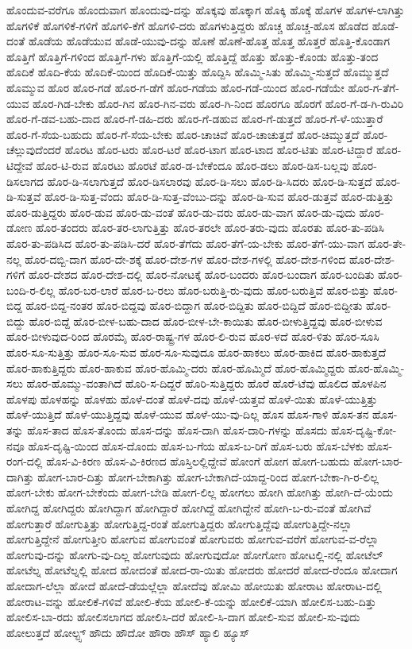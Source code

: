 {ಹೊಂದುವ-ವರೆಗೂ
ಹೊಂದುವಾಗ
ಹೊಂದುವು-ದನ್ನು
ಹೊಕ್ಕವು
ಹೊಕ್ಕಾಗ
ಹೊಕ್ಕಿ
ಹೊಕ್ಕೆ
ಹೊಗಳ
ಹೊಗಳ-ಲಾಗಿತ್ತು
ಹೊಗಳಿಕೆ
ಹೊಗಳಿಕೆ-ಗಳಿಗೆ
ಹೊಗಳಿ-ಕೆಗೆ
ಹೊಗಳಿ-ದರು
ಹೊಗಳುತ್ತಿದ್ದರು
ಹೊಚ್ಚ
ಹೊಚ್ಚ-ಹೊಸ
ಹೊಡೆದ
ಹೊಡೆ-ದಂತೆ
ಹೊಡೆಯ
ಹೊಡೆಯುವ
ಹೊಡೆ-ಯುವು-ದನ್ನು
ಹೊಣೆ
ಹೊಣೆ-ಹೊತ್ತ
ಹೊತ್ತ
ಹೊತ್ತರೆ
ಹೊತ್ತಿ-ಕೊಂಡಾಗ
ಹೊತ್ತಿಗೆ
ಹೊತ್ತಿಗೆ-ಗಳಿಂದ
ಹೊತ್ತಿಗೆ-ಗಳು
ಹೊತ್ತಿಗೆ-ಯಲ್ಲಿ
ಹೊತ್ತಿದ್ದೆ
ಹೊತ್ತು
ಹೊತ್ತು-ಕೊಂಡು
ಹೊತ್ತು-ತಂದ
ಹೊದಿಕೆ
ಹೊದಿ-ಕೆಯ
ಹೊದಿಕೆ-ಯಿಂದ
ಹೊದಿಕೆ-ಯಿತ್ತು
ಹೊದ್ದಿಸಿ
ಹೊಮ್ಮಿ-ಸಿತು
ಹೊಮ್ಮಿ-ಸುತ್ತದೆ
ಹೊಮ್ಮುತ್ತದೆ
ಹೊಮ್ಮುವ
ಹೊರ
ಹೊರ-ಗಡೆ
ಹೊರ-ಗ-ಡೆಗೆ
ಹೊರ-ಗಡೆಯ
ಹೊರ-ಗಡೆ-ಯಿಂದ
ಹೊರ-ಗಡೆಯೇ
ಹೊರ-ಗ-ತೆಗೆ-ಯುವ
ಹೊರ-ಗಿಡ-ಬೇಕು
ಹೊರ-ಗಿನ
ಹೊರ-ಗಿನ-ವರು
ಹೊರ-ಗಿ-ನಿಂದ
ಹೊರಗೂ
ಹೊರಗೆ
ಹೊರ-ಗೆ-ಡ-ಗಿ-ರುವಿರಿ
ಹೊರ-ಗೆ-ಡವ-ಬಹು-ದಾದ
ಹೊರ-ಗೆ-ಡಹಿ-ದರು
ಹೊರ-ಗೆ-ಡಹುವ
ಹೊರ-ಗೆ-ಡುತ್ತದೆ
ಹೊರ-ಗೆ-ಳೆ-ಯುತ್ತಾರೆ
ಹೊರ-ಗೆ-ಸೆಯ-ಬಹುದು
ಹೊರ-ಗೆ-ಸೆಯ-ಬೇಕು
ಹೊರ-ಚಾಚಿವೆ
ಹೊರ-ಚಾಚುತ್ತದೆ
ಹೊರ-ಚಿಮ್ಮುತ್ತದೆ
ಹೊರ-ಚೆಲ್ಲುವುದೆಂದರೆ
ಹೊರಟ
ಹೊರ-ಟರು
ಹೊರ-ಟರೆ
ಹೊರ-ಟಾಗ
ಹೊರ-ಟಾದ
ಹೊರ-ಟಿತು
ಹೊರ-ಟಿದ್ದಾರೆ
ಹೊರ-ಟಿದ್ದೇವೆ
ಹೊರ-ಟಿ-ರುವ
ಹೊರಟು
ಹೊರಟೆ
ಹೊರ-ಡ-ಬೇಕೆಂದೂ
ಹೊರ-ಡಲು
ಹೊರ-ಡಿಸ-ಬಲ್ಲವು
ಹೊರ-ಡಿಸಲಾಗದ
ಹೊರ-ಡಿ-ಸಲಾಗುತ್ತದೆ
ಹೊರ-ಡಿಸಲಾರವು
ಹೊರ-ಡಿ-ಸಲು
ಹೊರ-ಡಿ-ಸಿದರು
ಹೊರ-ಡಿ-ಸುತ್ತದೆ
ಹೊರ-ಡಿ-ಸುತ್ತವೆ
ಹೊರ-ಡಿ-ಸುತ್ತ-ವೆಂದು
ಹೊರ-ಡಿ-ಸುತ್ತ-ವೆಂಬು-ದನ್ನು
ಹೊರ-ಡಿ-ಸುವ
ಹೊರ-ಡುತ್ತವೆ
ಹೊರ-ಡುತ್ತಿತ್ತು
ಹೊರ-ಡುತ್ತಿದ್ದರು
ಹೊರ-ಡುವ
ಹೊರ-ಡು-ವಂತೆ
ಹೊರ-ಡು-ವರು
ಹೊರ-ಡು-ವಾಗ
ಹೊರ-ಡು-ವುದು
ಹೊರ-ಡೋಣ
ಹೊರ-ತಂದರು
ಹೊರ-ತರ-ಲಾಗುತ್ತಿತ್ತು
ಹೊರ-ತರಲೇ
ಹೊರ-ತರು-ವುದು
ಹೊರತು
ಹೊರ-ತು-ಪಡಿಸಿ
ಹೊರ-ತು-ಪಡಿಸಿದ
ಹೊರ-ತು-ಪಡಿಸಿ-ದರೆ
ಹೊರ-ತೆಗೆದು
ಹೊರ-ತೆಗೆ-ಯ-ಬೇಕು
ಹೊರ-ತೆಗೆ-ಯು-ವಾಗ
ಹೊರ-ತೇ-ನಲ್ಲ
ಹೊರ-ದಬ್ಬಿ-ದಾಗ
ಹೊರ-ದೇ-ಶಕ್ಕೆ
ಹೊರ-ದೇಶ-ಗಳ
ಹೊರ-ದೇಶ-ಗಳಲ್ಲಿ
ಹೊರ-ದೇಶ-ಗಳಿಂದ
ಹೊರ-ದೇಶ-ಗಳಿಗೆ
ಹೊರ-ದೇಶದ
ಹೊರ-ದೇಶ-ದಲ್ಲಿ
ಹೊರ-ನೋಟಕ್ಕೆ
ಹೊರ-ಬಂದರು
ಹೊರ-ಬಂದಾಗ
ಹೊರ-ಬಂದಿತು
ಹೊರ-ಬಂದಿ-ರ-ಲಿಲ್ಲ
ಹೊರ-ಬರ-ಲಾರೆ
ಹೊರ-ಬ-ರಲು
ಹೊರ-ಬರುತ್ತಿ-ರು-ವುದು
ಹೊರ-ಬರುತ್ತಿವೆ
ಹೊರ-ಬಿತ್ತು
ಹೊರ-ಬಿದ್ದ
ಹೊರ-ಬಿದ್ದ-ನಂತರ
ಹೊರ-ಬಿದ್ದವು
ಹೊರ-ಬಿದ್ದಾಗ
ಹೊರ-ಬಿದ್ದಿತು
ಹೊರ-ಬಿದ್ದಿದೆ
ಹೊರ-ಬಿದ್ದೀತು
ಹೊರ-ಬಿದ್ದು
ಹೊರ-ಬಿದ್ದೆ
ಹೊರ-ಬೀಳ-ಬಹು-ದಾದ
ಹೊರ-ಬೀಳ-ಬೇ-ಕಾಯಿತು
ಹೊರ-ಬೀಳುತ್ತಿದ್ದವು
ಹೊರ-ಬೀಳುವ
ಹೊರ-ಬೀಳುವುದ-ರಿಂದ
ಹೊರಮೈ
ಹೊರ-ರಾಷ್ಟ್ರ-ಗಳ
ಹೊರ-ಲಿ-ರುವ
ಹೊರ-ಳದೆ
ಹೊರ-ಳಿತು
ಹೊರ-ಸೂಸಿ
ಹೊರ-ಸೂ-ಸುತ್ತಿತ್ತು
ಹೊರ-ಸೂ-ಸುವ
ಹೊರ-ಸೂ-ಸುವುದೂ
ಹೊರ-ಹಾಕಲು
ಹೊರ-ಹಾಕಿದ
ಹೊರ-ಹಾಕುತ್ತದೆ
ಹೊರ-ಹಾಕುತ್ತಿದ್ದರು
ಹೊರ-ಹಾಕುವ
ಹೊರ-ಹೊಮ್ಮಿ-ದರು
ಹೊರ-ಹೊಮ್ಮಿದೆ
ಹೊರ-ಹೊಮ್ಮಿದ್ದರು
ಹೊರ-ಹೊಮ್ಮಿ-ಸಲು
ಹೊರ-ಹೊಮ್ಮು-ವಂತಾಗಿದೆ
ಹೊರಿ-ಸ-ದಿದ್ದರೆ
ಹೊರಿ-ಸುತ್ತಿದ್ದರು
ಹೊರೆ
ಹೊರೆ-ಟೆವು
ಹೊಲಿದ
ಹೊಳಪಿನ
ಹೊಳಪು
ಹೊಳಹನ್ನು
ಹೊಳಹು
ಹೊಳೆ-ದಂತೆ
ಹೊಳೆ-ದವು
ಹೊಳೆ-ಯತ್ತವೆ
ಹೊಳೆ-ಯಿತು
ಹೊಳೆ-ಯುತ್ತಿತ್ತು
ಹೊಳೆ-ಯುತ್ತಿದೆ
ಹೊಳೆ-ಯುತ್ತಿದ್ದವು
ಹೊಳೆ-ಯುವ
ಹೊಳೆ-ಯು-ವು-ದಿಲ್ಲ
ಹೊಸ
ಹೊಸ-ಗಾಳಿ
ಹೊಸ-ತನ
ಹೊಸ-ತನ್ನು
ಹೊಸ-ತಾದ
ಹೊಸ-ತೊಂದು
ಹೊಸ-ದನ್ನು
ಹೊಸ-ದಾಗಿ
ಹೊಸ-ದಾರಿ-ಗಳನ್ನು
ಹೊಸದು
ಹೊಸ-ದೃಷ್ಟಿ-ಕೋ-ನವೂ
ಹೊಸ-ದೃಷ್ಟಿ-ಯಿಂದ
ಹೊಸ-ದೊಂದು
ಹೊಸ-ಬ-ಗೆಯ
ಹೊಸ-ಬ-ರಿಗೆ
ಹೊಸ-ಬರು
ಹೊಸ-ಬೆಳಕು
ಹೊಸ-ರಂಗ-ದಲ್ಲಿ
ಹೊಸ-ವಿ-ಕಿರಣ
ಹೊಸ-ವಿ-ಕಿರಣದ
ಹೊಸ್ತಿಲಲ್ಲಿದ್ದೇವೆ
ಹೋಂಗೆ
ಹೋಗ
ಹೋಗ-ಬಹುದು
ಹೋಗ-ಬಾರ-ದಾಗಿತ್ತು
ಹೋಗ-ಬಾರ-ದಿತ್ತು
ಹೋಗ-ಬೇಕಾಗಿತ್ತು
ಹೋಗ-ಬೇಕಾಗಿದೆ-ಯಾದ್ದ-ರಿಂದ
ಹೋಗ-ಬೇಕಾ-ಗಿ-ರ-ಲಿಲ್ಲ
ಹೋಗ-ಬೇಕು
ಹೋಗ-ಬೇಕೆಂದು
ಹೋಗ-ಬೇಡಿ
ಹೋಗ-ಲಿಲ್ಲ
ಹೋಗಲು
ಹೋಗಿ
ಹೋಗಿತ್ತು
ಹೋಗಿ-ದೆ-ಯೆಂದು
ಹೋಗಿದ್ದ
ಹೋಗಿದ್ದರು
ಹೋಗಿದ್ದಾಗ
ಹೋಗಿದ್ದಾರೆ
ಹೋಗಿದ್ದೆ
ಹೋಗಿದ್ದೇನೆ
ಹೋಗಿ-ಬ-ರು-ವಂತೆ
ಹೋಗಿವೆ
ಹೋಗುತ್ತಾರೆ
ಹೋಗುತ್ತಿತ್ತು
ಹೋಗುತ್ತಿದ್ದ-ರಂತೆ
ಹೋಗುತ್ತಿದ್ದರು
ಹೋಗುತ್ತಿದ್ದೆವು
ಹೋಗುತ್ತಿದ್ದೇ-ನಲ್ಲಾ
ಹೋಗುತ್ತಿದ್ದೇನೆ
ಹೋಗುತ್ತೀರಿ
ಹೋಗುವ
ಹೋಗುವಂತೆ
ಹೋಗುವರು
ಹೋಗುವ-ವರೆಗೆ
ಹೋಗುವ-ವ-ರೆಲ್ಲಾ
ಹೋಗುವು-ದನ್ನು
ಹೋಗು-ವು-ದಿಲ್ಲ
ಹೋಗುವುದು
ಹೋಗುವುದೋ
ಹೋಗೋಣ
ಹೋಟಲ್ಲಿ-ನಲ್ಲಿ
ಹೋಟೆಲ್
ಹೋಟೆಲ್ನ
ಹೋಟೆಲ್ನಲ್ಲಿ
ಹೋದ
ಹೋದಂತೆ
ಹೋದ-ರಾ-ಯಿತು
ಹೋದರು
ಹೋದರೆ
ಹೋದ-ರೆಂದೂ
ಹೋದಾಗ
ಹೋದಾಗ-ಲೆಲ್ಲಾ
ಹೋದೆ
ಹೋದೆ-ಡೆಯಲ್ಲೆಲ್ಲಾ
ಹೋದೆವು
ಹೋಮಿ
ಹೋಯಿತು
ಹೋರಾಟ
ಹೋರಾಟ-ದಲ್ಲಿ
ಹೋರಾಟ-ವನ್ನು
ಹೋಲಿಕೆ-ಗಳಿವೆ
ಹೋಲಿ-ಕೆಯ
ಹೋಲಿ-ಕೆ-ಯನ್ನು
ಹೋಲಿಕೆ-ಯಾಗಿ
ಹೋಲಿಸ-ಬಹು-ದಿತ್ತು
ಹೋಲಿಸ-ಬಾ-ರದು
ಹೋಲಿಸಲಾಗದ
ಹೋಲಿಸಿ-ದರೆ
ಹೋಲಿ-ಸಿ-ದಾಗ
ಹೋಲಿ-ಸುವ
ಹೋಲಿ-ಸು-ವುದು
ಹೋಲುತ್ತದೆ
ಹೋಲ್ಟ್ಸ್
ಹೌದು
ಹೌದೋ
ಹೌರಾ
ಹೌಸ್
ಹ್ಯಾಲಿ
ಹ್ಯೂಸ್
}
